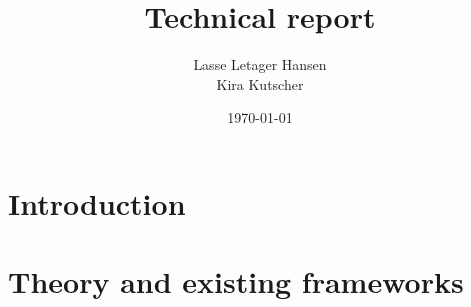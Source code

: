 \documentclass[11pt, leqno]{article}
\author{Lasse Letager Hansen %
  \\ Kira Kutscher %
}
\date{\today}
\title{Technical report}
\begin{document}

\newcommand\rml{$\mathcal{R}$\texttt{ml} } %
\newcommand\M{\texttt{M}} %


\maketitle

\tableofcontents
\newpage


\section{Introduction}



\section{Theory and existing frameworks}
\end{document}
